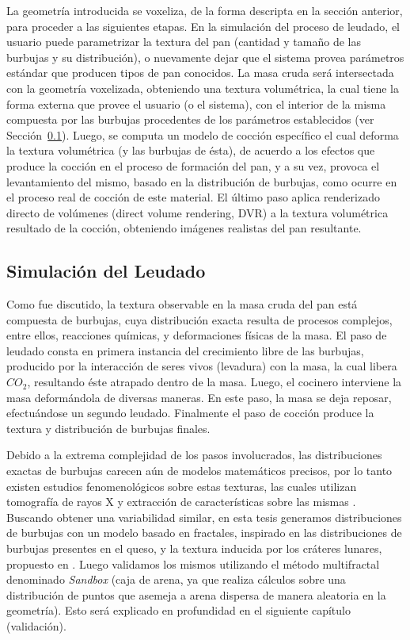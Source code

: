La geometría introducida se voxeliza, de la forma descripta en la sección anterior, para proceder a las siguientes etapas.
En la simulación del proceso de leudado, el usuario puede parametrizar la textura del pan (cantidad y tamaño de las burbujas y su distribución), o nuevamente dejar que el sistema provea parámetros estándar que producen tipos de pan conocidos.
La masa cruda será intersectada con la geometría voxelizada, obteniendo una textura volumétrica, la cual tiene la forma externa que provee el usuario (o el sistema), con el interior de la misma compuesta por las burbujas procedentes de los parámetros establecidos (ver Sección~\ref{breadprov}).
Luego, se computa un modelo de cocción específico \cite{Powathil2004} el cual deforma la textura volumétrica (y las burbujas de ésta), de acuerdo a los efectos que produce la cocción en el proceso de formación del pan, y a su vez, provoca el levantamiento del mismo, basado en la distribución de burbujas, como ocurre en el proceso real de cocción de este material.
El último paso aplica renderizado directo de volúmenes (direct volume rendering, DVR) \cite{Kruger2003} a la textura volumétrica resultado de la cocción, obteniendo imágenes realistas del pan resultante.



\subsection{Simulación del Leudado}
\label{breadprov}
Como fue discutido, la textura observable en la masa cruda del pan está compuesta de burbujas, cuya distribución exacta resulta de procesos complejos, entre ellos, reacciones químicas, y deformaciones físicas de la masa.
El paso de leudado consta en primera instancia del crecimiento libre de las burbujas, producido por la interacción de seres vivos (levadura) con la masa, la cual libera $CO_{2}$, resultando éste atrapado dentro de la masa.
Luego, el cocinero interviene la masa deformándola de diversas maneras.
En este paso, la masa se deja reposar, efectuándose un segundo leudado.
Finalmente el paso de cocción produce la textura y distribución de burbujas finales.

Debido a la extrema complejidad de los pasos involucrados, las distribuciones exactas de burbujas carecen aún de modelos matemáticos precisos, por lo tanto existen estudios fenomenológicos sobre estas texturas, las cuales utilizan tomografía de rayos X y extracción de características sobre las mismas \cite{Babin2006,Gonzales2008,VanDyck2014}.
Buscando obtener una variabilidad similar, en esta tesis generamos distribuciones de burbujas con un modelo basado en fractales, inspirado en las distribuciones de burbujas presentes en el queso, y la textura inducida por los cráteres lunares, propuesto en \cite{Mandelbrot1983}.
Luego validamos los mismos utilizando el método multifractal denominado {\em Sandbox} (caja de arena, ya que realiza cálculos sobre una distribución de puntos que asemeja a arena dispersa de manera aleatoria en la geometría).
Esto será explicado en profundidad en el siguiente capítulo (validación).

